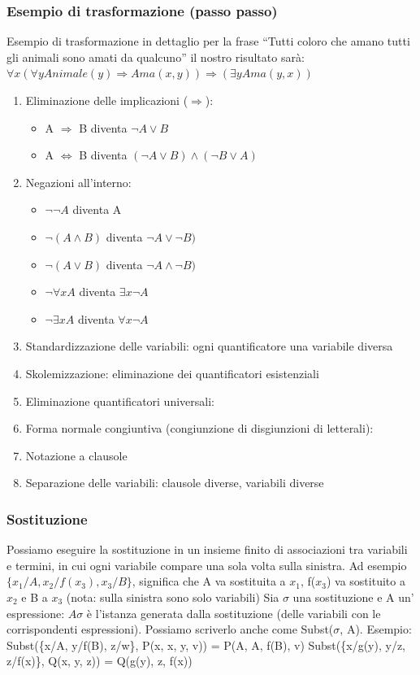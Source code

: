 \documentclass{article}
\begin{document}
\subsubsection{Esempio di trasformazione (passo passo)}
Esempio di trasformazione in dettaglio per la frase “Tutti coloro che amano tutti gli animali sono amati da qualcuno” \newline il nostro risultato sarà: $\forall x ( \forall y Animale(y) \Rightarrow Ama(x,y)) \Rightarrow (\exists y Ama(y, x))$
\begin{enumerate}
    \item Eliminazione delle implicazioni ($\Rightarrow$):
    \begin{itemize}
        \item A $\Rightarrow$ B diventa	$\neg A \lor B$
        \item A $\Leftrightarrow$ B diventa $(\neg A \lor B) \land (\neg B \lor A)$
    \end{itemize}
    \item Negazioni all'interno:
    \begin{itemize}
        \item $\neg \neg A$ diventa A
        \item $\neg (A \land B)$ diventa $\neg A \lor \neg B)$
        \item $\neg (A \lor B)$ diventa $\neg A \land \neg B)$
        \item $\neg \forall x A$ diventa $\exists x \neg A$
        \item $\neg \exists x A $ diventa $\forall x \neg A$
    \end{itemize}
    \item Standardizzazione delle variabili: ogni quantificatore una variabile diversa
    \item Skolemizzazione: eliminazione dei quantificatori esistenziali
    \item Eliminazione quantificatori universali: 
    \item Forma normale congiuntiva (congiunzione di disgiunzioni di letterali):
    \item Notazione a clausole
    \item Separazione delle variabili: clausole diverse, variabili diverse
\end{enumerate}
\subsubsection{Sostituzione}
Possiamo eseguire la sostituzione in un insieme finito di associazioni tra variabili e termini, in cui ogni variabile compare una sola volta sulla sinistra. Ad esempio $\{x_1/A, x_2/f(x_3), x_3/B\}$, significa che A va sostituita a $x_1$, f($x_3$) va sostituito a $x_2$ e B a $x_3$ (nota: sulla sinistra sono solo variabili)
Sia $\sigma$ una sostituzione e A un’ espressione: $A \sigma$ è l'istanza generata dalla sostituzione (delle variabili con le corrispondenti espressioni). Possiamo scriverlo anche come Subst($\sigma$, A). \newline
Esempio:
Subst(\{x/A, y/f(B), z/w\}, P(x, x, y, v)) = P(A, A, f(B), v) \newline
Subst(\{x/g(y), y/z, z/f(x)\}, Q(x, y, z)) = Q(g(y), z, f(x)) \newline
\end{document}
